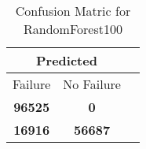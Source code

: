 \begin{table}[] 
\caption{Confusion Matric for RandomForest100} 
\label{Table: Prediction Accuracy-DMDRandomForest100OnlySunEKF-ignoreReflectionperfectNoFailurePrediction-Reflection} 
\centering 
\begin{tabular} 
 {@{}ccc@{}} 
\toprule 
\multicolumn{2}{c}{\textbf{Predicted}}
 \\ \midrule 
\multicolumn{1}{|c|}{Failure} & 
\multicolumn{1}{c|}{No Failure}
 \\ \midrule 
\multicolumn{1}{|c|}{\color{green}\textbf{96525}} & 
\multicolumn{1}{c|}{\color{red}\textbf{0}}
 \\ \midrule 
\multicolumn{1}{|c|}{\color{red}\textbf{16916}} & 
\multicolumn{1}{c|}{\color{green}\textbf{56687}}
 \\ \bottomrule 
\end{tabular} 
\end{table} 

